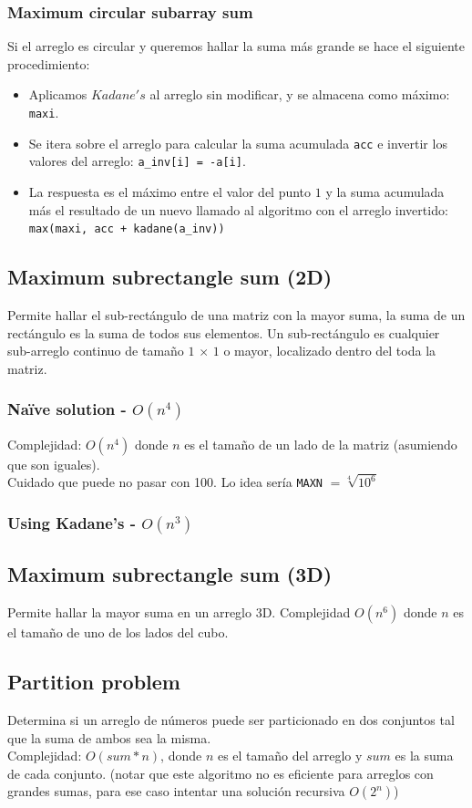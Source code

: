 \documentclass[10pt,letterpaper,twocolumn]{article}
\newcommand{\source}[1]{
  
  \dotfill
}
\begin{document}
    \subsubsection{Maximum circular subarray sum}
      Si el arreglo es circular y queremos hallar la suma más grande se hace el siguiente procedimiento:
      \begin{itemize}
        \item Aplicamos $Kadane's$ al arreglo sin modificar, y se almacena como máximo: \texttt{maxi}.
        \item Se itera sobre el arreglo para calcular la suma acumulada \texttt{acc} e invertir los valores del arreglo: \texttt{a\_inv[i] = -a[i]}.
        \item La respuesta es el máximo entre el valor del punto $1$ y la suma acumulada más el resultado de un nuevo llamado al algoritmo con el arreglo invertido: \texttt{max(maxi, acc + kadane(a\_inv))}
      \end{itemize}
  \subsection{Maximum subrectangle sum (2D)}
    Permite hallar el sub-rectángulo de una matriz con la mayor suma, la suma de un rectángulo es la suma de todos sus elementos. Un sub-rectángulo es cualquier sub-arreglo continuo de tamaño $1$ $\times$ $1$ o mayor, localizado dentro del toda la matriz.
    \subsubsection{Naïve solution - $O(n^4)$}
      Complejidad: $O(n^4)$ donde $n$ es el tamaño de un lado de la matriz (asumiendo que son iguales). \\
      Cuidado que puede no pasar con 100. Lo idea sería \texttt{MAXN} $= \sqrt[4]{10^6}$
      \source{./src/maximum2DSum.cpp}
    \subsubsection{Using Kadane's - $O(n^3)$}
      \source{./src/max_2d_sum_kadane.cpp}
  \subsection{Maximum subrectangle sum (3D)}
    Permite hallar la mayor suma en un arreglo 3D.
    Complejidad $O(n^6)$ donde $n$ es el tamaño de uno de los lados del cubo.
    \source{./src/maximum3DSum.cpp}
  \subsection{Partition problem}
    Determina si un arreglo de números puede ser particionado en dos conjuntos tal que la suma de ambos sea la misma. \\
    Complejidad: $O(sum * n)$, donde $n$ es el tamaño del arreglo y $sum$ es la suma de cada conjunto. (notar que este algoritmo no es eficiente para arreglos con grandes sumas, para ese caso intentar una solución recursiva $O(2^n)$)
    \source{./src/partition_problem.cpp}
\end{document}
